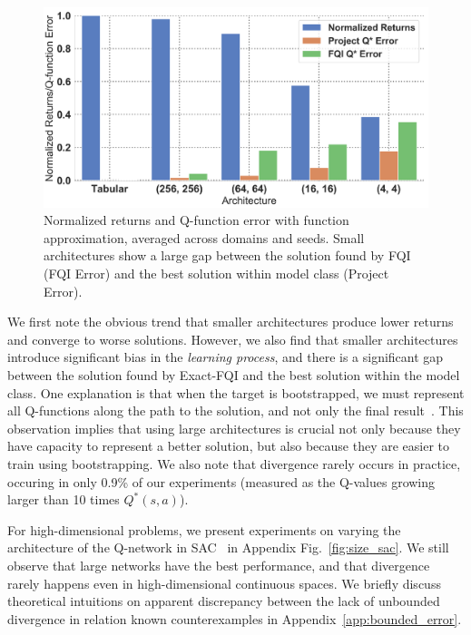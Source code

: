 \begin{figure}
\vspace{-0.5cm}
\caption{\label{fig:function_approx} Normalized returns and Q-function error with function approximation, averaged across domains and seeds. Small architectures show a large gap between the solution found by FQI (FQI Error) and the best solution within model class (Project Error).}
\centering
\includegraphics[width=0.7\linewidth]{chapters/diagnosing_q/images/fig_1.pdf}
\vspace{-0.8cm}
\end{figure}

We first note the obvious trend that smaller architectures produce lower returns and converge to worse solutions. 
However, we also find that smaller architectures introduce significant bias in the \textit{learning process}, and there is a significant gap between the solution found by Exact-FQI and the best solution within the model class. 
One explanation is that when the target is bootstrapped, we must represent all Q-functions along the path to the solution, and not only the final result~\citep{Bertsekas96}.
This observation implies that using large architectures is crucial not only because they have capacity to represent a better solution, but also because they are easier to train using bootstrapping. 
We also note that divergence rarely occurs in practice, occuring in only 0.9\% of our experiments (measured as the Q-values growing larger than 10 times $Q^*(s,a)$). 

For high-dimensional problems, we present experiments on varying the architecture of the Q-network in SAC~\cite{Haarnoja18} in Appendix Fig.~\ref{fig:size_sac}. We still observe that large networks have the best performance, and that divergence rarely happens even in high-dimensional continuous spaces. We briefly discuss theoretical intuitions on apparent discrepancy between the lack of unbounded divergence in relation known counterexamples in Appendix~\ref{app:bounded_error}.
